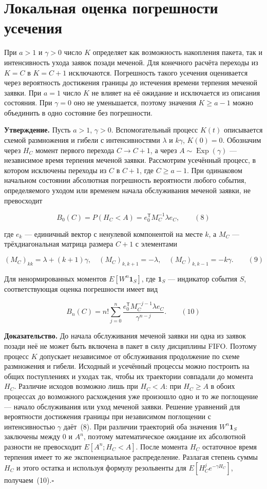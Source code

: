 \section*{Локальная оценка погрешности усечения}

При $a>1$ и $\gamma>0$ число $K$ определяет как возможность накопления пакета, так и интенсивность ухода заявок позади меченой. Для конечного расчёта переходы из $K=C$ в $K=C+1$ исключаются. Погрешность такого усечения оценивается через вероятность достижения границы до истечения времени терпения меченой заявки. При $a=1$ число $K$ не влияет на её ожидание и исключается из описания состояния. При $\gamma=0$ оно не уменьшается, поэтому значения $K\geq a-1$ можно объединить в одно состояние без погрешности.

\noindent\textbf{Утверждение.}
Пусть $a>1$, $\gamma>0$. Вспомогательный процесс $K(t)$ описывается схемой размножения и гибели с интенсивностями $\lambda$ и $k\gamma$, $K(0)=0$. Обозначим через $H_C$ момент первого перехода $C\to C+1$, а через $A\sim\operatorname{Exp}(\gamma)$ --- независимое время терпения меченой заявки. Рассмотрим усечённый процесс, в котором исключены переходы из $C$ в $C+1$, где $C\geq a-1$. При одинаковом начальном состоянии абсолютная погрешность вероятности любого события, определяемого уходом или временем начала обслуживания меченой заявки, не превосходит

\[B_0(C)=P(H_C<A)=e_0^{\mathsf T}M_C^{-1}\lambda e_C,\qquad (8)\]

где $e_k$ --- единичный вектор с ненулевой компонентой на месте $k$, а $M_C$ --- трёхдиагональная матрица размера $C+1$ с элементами

\[(M_C)_{kk}=\lambda+(k+1)\gamma,\quad
 (M_C)_{k,k+1}=-\lambda,\quad (M_C)_{k,k-1}=-k\gamma.\qquad (9)\]

Для ненормированных моментов $E[W^n\mathbf1_S]$, где $\mathbf1_S$ --- индикатор события $S$, соответствующая оценка погрешности имеет вид

\[B_n(C)=n!\sum_{j=0}^{n}
 \frac{e_0^{\mathsf T}M_C^{-j-1}\lambda e_C}{\gamma^{n-j}}.\qquad (10)\]


\noindent\textbf{Доказательство.}
До начала обслуживания меченой заявки ни одна из заявок позади неё не может быть включена в пакет в силу дисциплины FIFO. Поэтому процесс $K$ допускает независимое от обслуживания продолжение по схеме размножения и гибели. Исходный и усечённый процессы можно построить на общих поступлениях и уходах так, чтобы их траектории совпадали до момента $H_C$. Различие исходов возможно лишь при $H_C<A$: при $H_C\geq A$ в обоих процессах до возможного расхождения уже произошло одно и то же поглощение --- начало обслуживания или уход меченой заявки. Решение уравнений для вероятности достижения границы при независимом поглощении с интенсивностью $\gamma$ даёт~(8). При различии траекторий оба значения $W^n\mathbf1_S$ заключены между $0$ и $A^n$, поэтому математическое ожидание их абсолютной разности не превосходит $E[A^n;H_C<A]$. После момента $H_C$ остаточное время терпения имеет то же экспоненциальное распределение. Разлагая степень суммы $H_C$ и этого остатка и используя формулу резольвенты для $E[H_C^j e^{-\gamma H_C}]$, получаем~(10).\hfill$\square$

